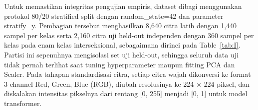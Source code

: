 Untuk memastikan integritas pengujian empiris, dataset dibagi menggunakan protokol 80/20 stratified split dengan random\_state=42 dan parameter stratify=y. Pembagian tersebut menghasilkan 8,640 citra latih dengan 1,440 sampel per kelas serta 2,160 citra uji held-out independen dengan 360 sampel per kelas pada enam kelas interseksional, sebagaimana dirinci pada Table~\ref{tab:I}. Partisi ini sepenuhnya mengisolasi set uji held-out, sehingga seluruh data uji tidak pernah terlihat saat tuning hyperparameter maupun fitting PCA dan Scaler. Pada tahapan standardisasi citra, setiap citra wajah dikonversi ke format 3-channel Red, Green, Blue (RGB), diubah resolusinya ke 224 $\times$ 224 piksel, dan diskalakan intensitas pikselnya dari rentang [0, 255] menjadi [0, 1] untuk model transformer.
